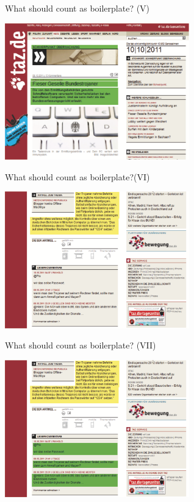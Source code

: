 \begin{frame}
  {What should count as boilerplate? (V)}
  \begin{center}
    \includegraphics[width=8cm]{graphicswcc/webseite-e}
  \end{center}
\end{frame}



\begin{frame}
  {What should count as boilerplate?(VI)}
  \begin{center}
    \includegraphics[width=8cm]{graphicswcc/webseite3}
  \end{center}
\end{frame}


\begin{frame}
  {What should count as boilerplate? (VII)}
  \begin{center}
    \includegraphics[width=8cm]{graphicswcc/webseite3-b}
  \end{center}
\end{frame}


